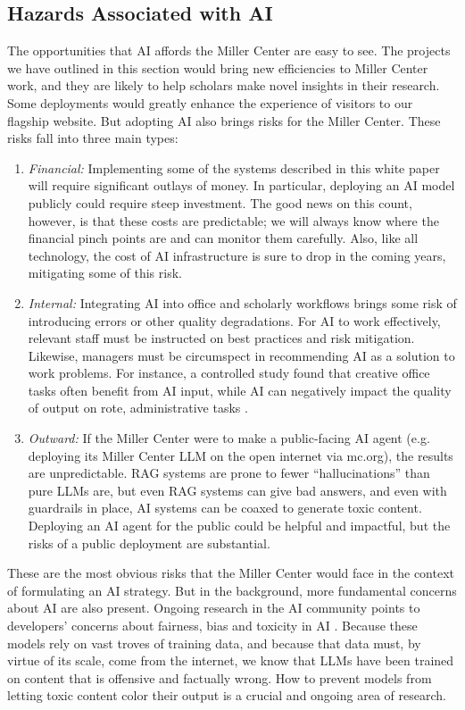 \documentclass[12pt, oneside]{article}   	%
\begin{document}
\subsection{Hazards Associated with AI}\label{section.projects.hazards}
The opportunities that AI affords the Miller Center are easy to see.  The projects we have outlined in this section would bring new efficiencies to Miller Center work, and they are likely to help scholars make novel insights in their research.  Some deployments would greatly enhance the experience of visitors to our flagship website.  But adopting AI also brings  risks for the Miller Center.  These risks fall into three main types:
\begin{enumerate}
\item \emph{Financial:}  Implementing some of the systems described in this white paper will require significant outlays of money.  In particular, deploying an AI model publicly could require steep investment.  The good news on this count, however, is that these costs are predictable; we will always know where the financial pinch points are and can monitor them carefully.  Also, like all technology, the cost of AI infrastructure is sure to drop in the coming years, mitigating some of this risk.
\item \emph{Internal:} Integrating AI into office  and scholarly workflows brings some risk of introducing errors or other quality degradations.  For AI to work effectively, relevant staff must be instructed on best practices and risk mitigation.  Likewise, managers must be circumspect in recommending AI as a solution to work problems.  For instance, a controlled study found that creative office tasks often benefit from AI input, while AI can negatively impact the quality of output on rote, administrative tasks \cite{candelon:2023}.  
\item \emph{Outward:}  If the Miller Center were to make a public-facing AI agent (e.g. deploying its Miller Center LLM on the open internet via mc.org), the results are unpredictable.  RAG systems are prone to fewer ``hallucinations'' than pure LLMs are, but even RAG systems can  give bad answers, and even with guardrails in place, AI systems can be coaxed to generate toxic content.  Deploying an AI agent for the public could be helpful and impactful, but the risks of a public deployment are substantial.
\end{enumerate}
These  are the most obvious risks that the Miller Center would face in the context of formulating an AI strategy.  But in the background, more fundamental concerns about AI are also present.  Ongoing research in the AI community points to developers' concerns about fairness, bias and toxicity in AI \cite{cheatham:2019, hendrycks:2023}.  Because these models rely on vast troves of training data, and because that data must, by virtue of its scale, come from the internet, we know that LLMs have been trained on content that is offensive and factually wrong.  How to prevent models from letting toxic content color their output is a crucial and ongoing area of research.  
\end{document}
